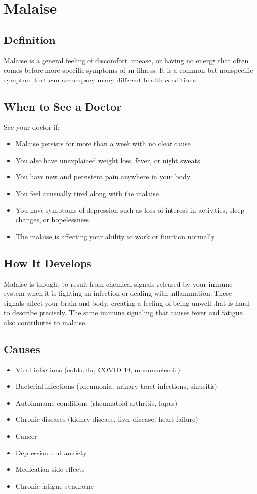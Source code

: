 \chapter{Malaise}

\section*{Definition}
Malaise is a general feeling of discomfort, unease, or having no energy that often comes before more specific symptoms of an illness. It is a common but nonspecific symptom that can accompany many different health conditions.

\section*{When to See a Doctor}
See your doctor if:
\begin{itemize}
  \item Malaise persists for more than a week with no clear cause
  \item You also have unexplained weight loss, fever, or night sweats
  \item You have new and persistent pain anywhere in your body
  \item You feel unusually tired along with the malaise
  \item You have symptoms of depression such as loss of interest in activities, sleep changes, or hopelessness
  \item The malaise is affecting your ability to work or function normally
\end{itemize}

\section*{How It Develops}
Malaise is thought to result from chemical signals released by your immune system when it is fighting an infection or dealing with inflammation. These signals affect your brain and body, creating a feeling of being unwell that is hard to describe precisely. The same immune signaling that causes fever and fatigue also contributes to malaise.

\section*{Causes}
\begin{itemize}
  \item Viral infections (colds, flu, COVID-19, mononucleosis)
  \item Bacterial infections (pneumonia, urinary tract infections, sinusitis)
  \item Autoimmune conditions (rheumatoid arthritis, lupus)
  \item Chronic diseases (kidney disease, liver disease, heart failure)
  \item Cancer
  \item Depression and anxiety
  \item Medication side effects
  \item Chronic fatigue syndrome
\end{itemize}

